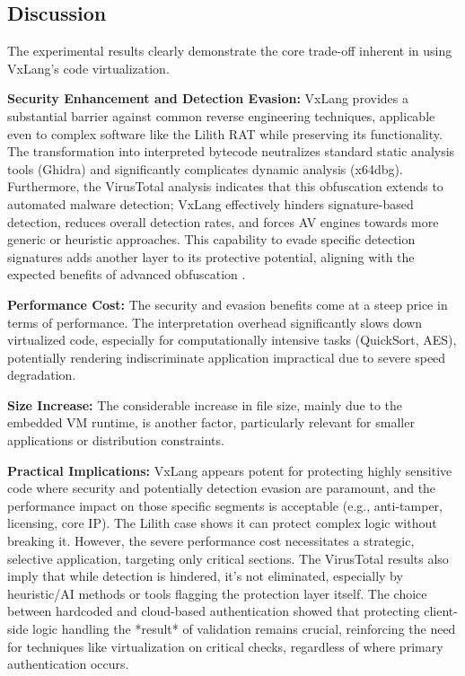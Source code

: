 \subsection{Discussion}
The experimental results clearly demonstrate the core trade-off inherent in using VxLang's code virtualization.

\textbf{Security Enhancement and Detection Evasion:} VxLang provides a substantial barrier against common reverse engineering techniques, applicable even to complex software like the Lilith RAT while preserving its functionality. The transformation into interpreted bytecode neutralizes standard static analysis tools (Ghidra) and significantly complicates dynamic analysis (x64dbg). Furthermore, the VirusTotal analysis indicates that this obfuscation extends to automated malware detection; VxLang effectively hinders signature-based detection, reduces overall detection rates, and forces AV engines towards more generic or heuristic approaches. This capability to evade specific detection signatures adds another layer to its protective potential, aligning with the expected benefits of advanced obfuscation \cite{Ore06, Sal18, Rou13}.

\textbf{Performance Cost:} The security and evasion benefits come at a steep price in terms of performance. The interpretation overhead significantly slows down virtualized code, especially for computationally intensive tasks (QuickSort, AES), potentially rendering indiscriminate application impractical due to severe speed degradation.

\textbf{Size Increase:} The considerable increase in file size, mainly due to the embedded VM runtime, is another factor, particularly relevant for smaller applications or distribution constraints.

\textbf{Practical Implications:} VxLang appears potent for protecting highly sensitive code where security and potentially detection evasion are paramount, and the performance impact on those specific segments is acceptable (e.g., anti-tamper, licensing, core IP). The Lilith case shows it can protect complex logic without breaking it. However, the severe performance cost necessitates a strategic, selective application, targeting only critical sections. The VirusTotal results also imply that while detection is hindered, it's not eliminated, especially by heuristic/AI methods or tools flagging the protection layer itself. The choice between hardcoded and cloud-based authentication showed that protecting client-side logic handling the *result* of validation remains crucial, reinforcing the need for techniques like virtualization on critical checks, regardless of where primary authentication occurs.
